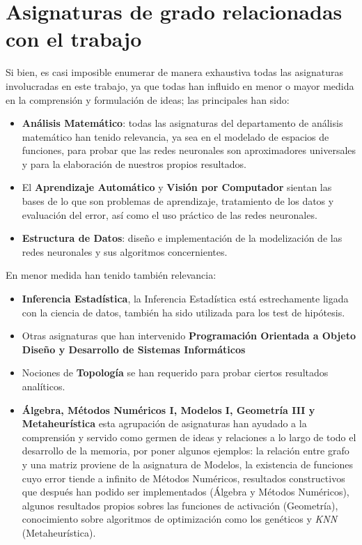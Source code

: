 
\section{Asignaturas de grado relacionadas con el trabajo }  
\label{ch01:asignaturas}
Si bien, es casi imposible enumerar de manera
exhaustiva todas las asignaturas involucradas en este trabajo,
ya que todas han influido en menor o mayor medida en la comprensión 
y formulación de ideas; las principales han
sido: 
\begin{itemize}
    \item \textbf{Análisis Matemático}: todas las asignaturas del departamento de análisis matemático
    han tenido relevancia, ya sea en el modelado de espacios de funciones,
    para probar que las redes neuronales son aproximadores universales
    y para la elaboración de nuestros propios resultados.  
    \item El \textbf{Aprendizaje Automático} y \textbf{Visión por Computador} sientan las bases de lo que son problemas de aprendizaje, 
    tratamiento de los datos y evaluación del error, así como el uso práctico de las redes neuronales. 
    \item \textbf{Estructura de Datos}: diseño e implementación de la modelización de las redes neuronales y 
    sus algoritmos concernientes. 
\end{itemize}

En menor medida han tenido también relevancia: 
\begin{itemize}
    \item \textbf{Inferencia Estadística}, la Inferencia Estadística está estrechamente ligada con 
    la ciencia de datos, también ha sido utilizada para los test de hipótesis. 
    \item Otras asignaturas que han intervenido \textbf{Programación Orientada a Objeto} \textbf{Diseño y Desarrollo de Sistemas Informáticos}
    \item Nociones de \textbf{Topología} se han requerido para probar ciertos resultados analíticos. 
    \item \textbf{Álgebra, Métodos Numéricos I, Modelos I, Geometría III y Metaheurística} esta agrupación de asignaturas 
    han ayudado a la comprensión  y servido como germen de ideas y relaciones a lo largo de todo el desarrollo de la memoria, 
    por poner algunos ejemplos: la relación entre grafo y una matriz proviene de la asignatura de Modelos, 
    la existencia de funciones cuyo error tiende a infinito de Métodos Numéricos,
    resultados constructivos  que después han podido ser implementados (Álgebra y Métodos Numéricos), algunos resultados propios sobres las funciones de activación (Geometría), 
    conocimiento sobre algoritmos de optimización como los genéticos y \textit{KNN} (Metaheurística).
\end{itemize}